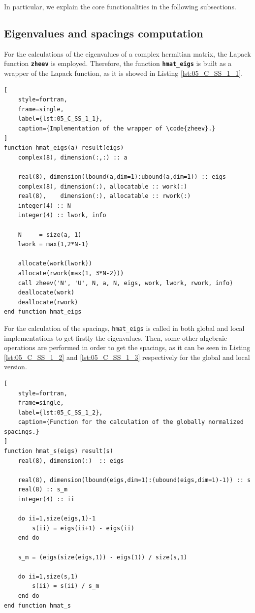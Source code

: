 \documentclass[pra, onecolumn, notitlepage, floats, 11pt]{revtex4-1}
\newcommand{\codebold}[2][cobalt]{\texttt{\bfseries {\color{#1}#2}}}
\newcommand{\code}[2][black]{\color{#1}\texttt{#2}}
\begin{document}
In particular, we explain the core functionalities in the following subsections.



\subsection{Eigenvalues and spacings computation}
For the calculations of the eigenvalues of a complex hermitian matrix, the Lapack function \codebold[black]{zheev} is employed. Therefore, the function \codebold[black]{hmat\_eigs} is built as a wrapper of the Lapack function, as it is showed in Listing \ref{lst:05_C_SS_1_1}.

\medskip
\begin{lstlisting}[
    style=fortran,
    frame=single,
    label={lst:05_C_SS_1_1},
    caption={Implementation of the wrapper of \code{zheev}.}
]
function hmat_eigs(a) result(eigs)
    complex(8), dimension(:,:) :: a

    real(8), dimension(lbound(a,dim=1):ubound(a,dim=1)) :: eigs
    complex(8), dimension(:), allocatable :: work(:)
    real(8),    dimension(:), allocatable :: rwork(:)
    integer(4) :: N
    integer(4) :: lwork, info

    N     = size(a, 1)
    lwork = max(1,2*N-1)

    allocate(work(lwork))
    allocate(rwork(max(1, 3*N-2)))
    call zheev('N', 'U', N, a, N, eigs, work, lwork, rwork, info)
    deallocate(work)
    deallocate(rwork)
end function hmat_eigs
\end{lstlisting}

For the calculation of the spacings, \code{hmat\_eigs} is called in both global and local implementations to get firstly the eigenvalues. Then, some other algebraic operations are performed in order to get the spacings, as it can be seen in Listing \ref{lst:05_C_SS_1_2} and \ref{lst:05_C_SS_1_3} respectively for the global and local version.

\medskip
\begin{lstlisting}[
    style=fortran,
    frame=single,
    label={lst:05_C_SS_1_2},
    caption={Function for the calculation of the globally normalized spacings.}
]
function hmat_s(eigs) result(s)
    real(8), dimension(:)  :: eigs

    real(8), dimension(lbound(eigs,dim=1):(ubound(eigs,dim=1)-1)) :: s
    real(8) :: s_m
    integer(4) :: ii

    do ii=1,size(eigs,1)-1
        s(ii) = eigs(ii+1) - eigs(ii)
    end do

    s_m = (eigs(size(eigs,1)) - eigs(1)) / size(s,1)

    do ii=1,size(s,1)
        s(ii) = s(ii) / s_m
    end do
end function hmat_s
\end{lstlisting}
\end{document}
